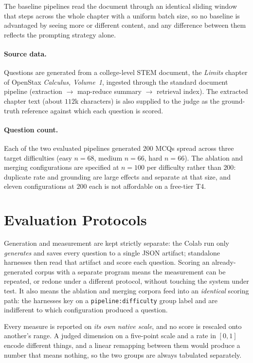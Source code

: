 The baseline pipelines read the document through an identical sliding window
that steps across the whole chapter with a uniform batch size, so no baseline is
advantaged by seeing more or different content, and any difference between them
reflects the prompting strategy alone.

\paragraph{Source data.} Questions are generated from a college-level STEM
document, the \emph{Limits} chapter of OpenStax \emph{Calculus, Volume~1},
ingested through the standard document pipeline (extraction $\rightarrow$
map-reduce summary $\rightarrow$ retrieval index). The extracted chapter text
(about $112$k characters) is also supplied to the judge as the ground-truth
reference against which each question is scored.

\paragraph{Question count.} Each of the two evaluated pipelines generated $200$
MCQs spread across three target difficulties (easy $n{=}68$, medium $n{=}66$,
hard $n{=}66$). The ablation and merging configurations are specified at
$n{=}100$ per difficulty rather than $200$: duplicate rate and grounding are
large effects and separate at that size, and eleven configurations at $200$ each
is not affordable on a free-tier T4.

\section{Evaluation Protocols}
\label{sec:res-protocol}

Generation and measurement are kept strictly separate: the Colab run only
\emph{generates} and saves every question to a single JSON artifact; standalone
harnesses then read that artifact and score each question. Scoring an
already-generated corpus with a separate program means the measurement can be
repeated, or redone under a different protocol, without touching the system
under test. It also means the ablation and merging corpora feed into an
\emph{identical} scoring path: the harnesses key on a
\texttt{pipeline:difficulty} group label and are indifferent to which
configuration produced a question.

Every measure is reported on \emph{its own native scale}, and no score is
rescaled onto another's range. A judged dimension on a five-point scale and a
rate in $[0,1]$ encode different things, and a linear remapping between them
would produce a number that means nothing, so the two groups are always
tabulated separately.

